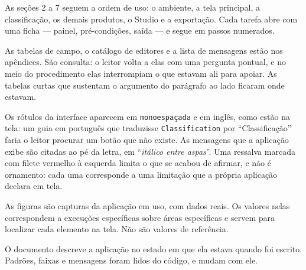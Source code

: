 \documentclass[12pt,a4paper]{article}
\newcommand{\msg}[1]{``\textit{#1}''}
\begin{document}
 As se\c{c}\~oes 2 a 7 seguem a ordem de uso: o
ambiente, a tela principal, a classifica\c{c}\~ao, os demais produtos, o Studio
e a exporta\c{c}\~ao. Cada tarefa abre com uma ficha --- painel,
pr\'e-condi\c{c}\~oes, sa\'ida --- e segue em passos numerados.

As tabelas de campo, o cat\'alogo de editores e a lista de mensagens est\~ao
nos ap\^endices. S\~ao consulta: o leitor volta a elas com uma pergunta
pontual, e no meio do procedimento elas interrompiam o que estavam ali para
apoiar. As tabelas curtas que sustentam o argumento do par\'agrafo ao lado
ficaram onde estavam.

 Os r\'otulos da interface aparecem em
\texttt{monoespa\c{c}ada} e em ingl\^es, como est\~ao na tela: um guia em
portugu\^es que traduzisse \texttt{Classification} por ``Classifica\c{c}\~ao''
faria o leitor procurar um bot\~ao que n\~ao existe. As mensagens que a
aplica\c{c}\~ao exibe s\~ao citadas ao p\'e da letra, em \msg{it\'alico entre
aspas}. Uma ressalva marcada com filete vermelho \`a esquerda limita o que se
acabou de afirmar, e n\~ao \'e ornamento: cada uma corresponde a uma
limita\c{c}\~ao que a pr\'opria aplica\c{c}\~ao declara em tela.

\begin{aviso}
As figuras s\~ao capturas da aplica\c{c}\~ao em uso, com dados reais. Os
valores nelas correspondem a execu\c{c}\~oes espec\'ificas sobre \'areas
espec\'ificas e servem para localizar cada elemento na tela. N\~ao s\~ao
valores de refer\^encia.
\end{aviso}

 O documento descreve a aplica\c{c}\~ao no
estado em que ela estava quando foi escrito. Padr\~oes, faixas e mensagens
foram lidos do c\'odigo, e mudam com ele.

%
\end{document}
